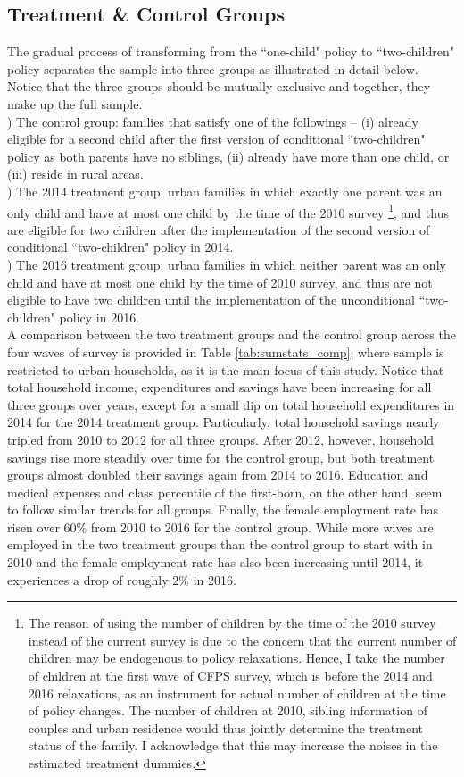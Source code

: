 \documentclass[12pt]{extarticle}
\begin{document}
\subsection{Treatment \& Control Groups}
The gradual process of transforming from the ``one-child" policy to ``two-children" policy separates the sample into three groups as illustrated in detail below. Notice that the three groups should be mutually exclusive and together, they make up the full sample. \\
) The control group: families that satisfy one of the followings -- (i) already eligible for a second child after the first version of conditional ``two-children" policy as both parents have no siblings, (ii) already have more than one child, or (iii) reside in rural areas. \\
) The 2014 treatment group: urban families in which exactly one parent was an only child and have at most one child by the time of the 2010 survey \footnote{The reason of using the number of children by the time of the 2010 survey instead of the current survey is due to the concern that the current number of children may be endogenous to policy relaxations. Hence, I take the number of children at the first wave of CFPS survey, which is before the 2014 and 2016 relaxations, as an instrument for actual number of children at the time of policy changes. The number of children at 2010, sibling information of couples and urban residence would thus jointly determine the treatment status of the family. I acknowledge that this may increase the noises in the estimated treatment dummies.}, and thus are eligible for two children after the implementation of the second version of conditional ``two-children" policy in 2014. \\
) The 2016 treatment group: urban families in which neither parent was an only child and have at most one child by the time of 2010 survey, and thus are not eligible to have two children until the implementation of the unconditional ``two-children" policy in 2016. \\
\indent A comparison between the two treatment groups and the control group across the four waves of survey is provided in Table \ref{tab:sumstats_comp}, where sample is restricted to urban households, as it is the main focus of this study. Notice that total household income, expenditures and savings have been increasing for all three groups over years, except for a small dip on total household expenditures in 2014 for the 2014 treatment group. Particularly, total household savings nearly tripled from 2010 to 2012 for all three groups. After 2012, however, household savings rise more steadily over time for the control group, but both treatment groups almost doubled their savings again from 2014 to 2016. Education and medical expenses and class percentile of the first-born, on the other hand, seem to follow similar trends for all groups. Finally, the female employment rate has risen over 60\% from 2010 to 2016 for the control group. While more wives are employed in the two treatment groups than the control group to start with in 2010 and the female employment rate has also been increasing until 2014, it experiences a drop of roughly 2\% in 2016.
\end{document}
